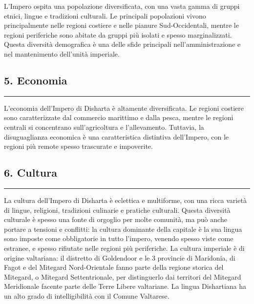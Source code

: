 L'Impero ospita una popolazione diversificata, con una vasta gamma di
gruppi etnici, lingue e tradizioni culturali. Le principali popolazioni
vivono principalmente nelle regioni costiere e nelle pianure
Sud-Occidentali, mentre le regioni periferiche sono abitate da gruppi
più isolati e spesso marginalizzati. Questa diversità demografica è una
delle sfide principali nell'amministrazione e nel mantenimento
dell'unità imperiale.

\subsection{5. Economia}\label{economia}

\begin{center}\rule{0.5\linewidth}{0.5pt}\end{center}

L'economia dell'Impero di Disharta è altamente diversificata. Le regioni
costiere sono caratterizzate dal commercio marittimo e dalla pesca,
mentre le regioni centrali si concentrano sull'agricoltura e
l'allevamento. Tuttavia, la disuguaglianza economica è una
caratteristica distintiva dell'Impero, con le regioni più remote spesso
trascurate e impoverite.

\subsection{6. Cultura}\label{cultura}

\begin{center}\rule{0.5\linewidth}{0.5pt}\end{center}

La cultura dell'Impero di Disharta è eclettica e multiforme, con una
ricca varietà di lingue, religioni, tradizioni culinarie e pratiche
culturali. Questa diversità culturale è spesso una fonte di orgoglio per
molte comunità, ma può anche portare a tensioni e conflitti: la cultura
dominante della capitale è la sua lingua sono imposte come obbligatorie
in tutto l'impero, venendo spesso viste come estranee, e spesso
rifiutate nelle regioni più periferiche. La cultura imperiale è di
origine valtariana: il distretto di Goldendoor e le 3 provincie di
Maridonia, di Fagot e del Mitegard Nord-Orientale fanno parte della
regione storica del Mitegard, o Mitegard Settentrionale, per
distinguerlo dai territori del Mitegard Meridionale facente parte delle
Terre Libere valtariane. La lingua Dishartiana ha un alto grado di
intelligibilità con il Comune Valtarese.

